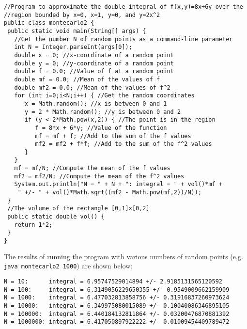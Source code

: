 \vspace{3mm}
\begin{lstlisting}
//Program to approximate the double integral of f(x,y)=8x+6y over the
//region bounded by x=0, x=1, y=0, and y=2x^2
public class montecarlo2 {
 public static void main(String[] args) {
   //Get the number N of random points as a command-line parameter
   int N = Integer.parseInt(args[0]);
   double x = 0; //x-coordinate of a random point
   double y = 0; //y-coordinate of a random point
   double f = 0.0; //Value of f at a random point
   double mf = 0.0; //Mean of the values of f
   double mf2 = 0.0; //Mean of the values of f^2
   for (int i=0;i<N;i++) { //Get the random coordinates
      x = Math.random(); //x is between 0 and 1
      y = 2 * Math.random(); //y is between 0 and 2
      if (y < 2*Math.pow(x,2)) { //The point is in the region
         f = 8*x + 6*y; //Value of the function
         mf = mf + f; //Add to the sum of the f values
         mf2 = mf2 + f*f; //Add to the sum of the f^2 values
      }
   }
   mf = mf/N; //Compute the mean of the f values
   mf2 = mf2/N; //Compute the mean of the f^2 values
   System.out.println("N = " + N + ": integral = " + vol()*mf +
    " +/- " + vol()*Math.sqrt((mf2 - Math.pow(mf,2))/N));
 }
 //The volume of the rectangle [0,1]x[0,2]
 public static double vol() {
   return 1*2;
 }
}
\end{lstlisting}

The results of running the program with various numbers of random points (e.g. \texttt{java montecarlo2 1000})
are shown below:

\begin{verbatim}
N = 10:      integral = 6.95747529014894 +/- 2.9185131565120592
N = 100:     integral = 6.3149056229650355 +/- 0.9549009662159909
N = 1000:    integral = 6.477032813858756 +/- 0.31916837260973624
N = 10000:   integral = 6.349975080015089 +/- 0.10040086346895105
N = 100000:  integral = 6.440184132811864 +/- 0.03200476870881392
N = 1000000: integral = 6.417050897922222 +/- 0.01009454409789472
\end{verbatim}

